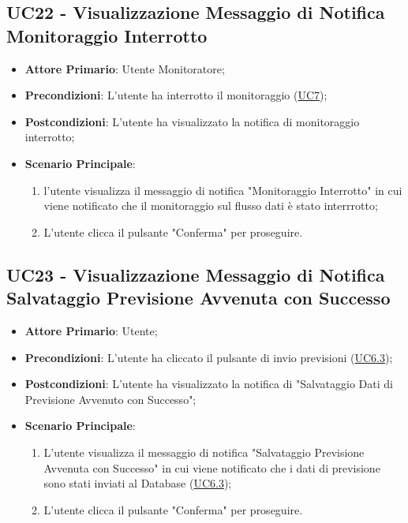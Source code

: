 
	\label{par:UC22}
	\subsection{UC22 - Visualizzazione Messaggio di Notifica Monitoraggio Interrotto}
		\begin{itemize}
			\item\textbf{Attore Primario}: Utente Monitoratore;
			\item\textbf{Precondizioni}: L’utente ha interrotto il monitoraggio (\hyperref[par:UC7]{UC7});
			\item\textbf{Postcondizioni}: L’utente ha visualizzato la notifica di monitoraggio interrotto;
			\item\textbf{Scenario Principale}: 
				\begin{enumerate} 
					\item l’utente visualizza il messaggio di notifica "Monitoraggio Interrotto" in cui viene notificato che il monitoraggio sul flusso dati è stato interrrotto;
					\item L'utente clicca il pulsante "Conferma" per proseguire.		
				\end{enumerate}		
		\end{itemize}


		
	\label{par:UC23}
	\subsection{UC23 - Visualizzazione Messaggio di Notifica Salvataggio Previsione Avvenuta con Successo}	\begin{itemize}
			\item\textbf{Attore Primario}: Utente;
			\item\textbf{Precondizioni}: L'utente ha cliccato il pulsante di invio previsioni (\hyperref[par:UC6.3]{UC6.3});
			\item\textbf{Postcondizioni}: L'utente ha visualizzato la notifica di "Salvataggio Dati di Previsione Avvenuto con Successo"; 
			\item\textbf{Scenario Principale}: 
				\begin{enumerate} 
					\item L’utente visualizza il messaggio di notifica "Salvataggio Previsione Avvenuta con Successo" in cui viene notificato che i dati di previsione sono stati inviati al Database (\hyperref[par:UC6.3]{UC6.3});
					\item L'utente clicca il pulsante "Conferma" per proseguire.		
				\end{enumerate}		
		\end{itemize}

